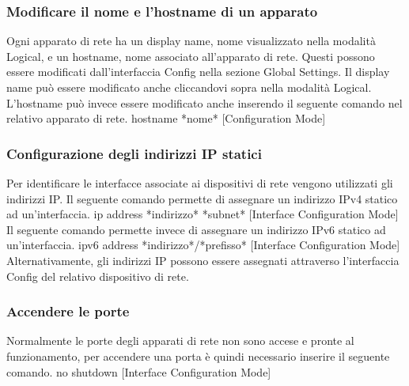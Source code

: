 \subsubsection{Modificare il nome e l'hostname di un apparato} 
Ogni apparato di rete ha un display name, nome visualizzato nella modalità Logical, e un hostname, nome associato all'apparato di rete. Questi possono essere modificati dall'interfaccia Config nella sezione Global Settings. Il display name può essere modificato anche cliccandovi sopra nella modalità Logical. L'hostname può invece essere modificato anche inserendo il seguente comando nel relativo apparato di rete.
\newline
\smallskip
\newline
hostname *nome* [Configuration Mode]

\subsubsection{Configurazione degli indirizzi IP statici} 
Per identificare le interfacce associate ai dispositivi di rete vengono utilizzati gli indirizzi IP. Il seguente comando permette di assegnare un indirizzo IPv4 statico ad un'interfaccia. \newline
\smallskip
\newline
ip address *indirizzo* *subnet* [Interface Configuration Mode] \newline
\smallskip
\newline
Il seguente comando permette invece di assegnare un indirizzo IPv6 statico ad un'interfaccia. \newline
\smallskip
\newline  
ipv6 address *indirizzo*/*prefisso* [Interface Configuration Mode] \newline
\smallskip
\newline
Alternativamente, gli indirizzi IP possono essere assegnati attraverso l'interfaccia Config del relativo dispositivo di rete. 

\subsubsection{Accendere le porte}
Normalmente le porte degli apparati di rete non sono accese e pronte al funzionamento, per accendere una porta è quindi necessario inserire il seguente comando.
\newline
\smallskip
\newline
no shutdown [Interface Configuration Mode]

